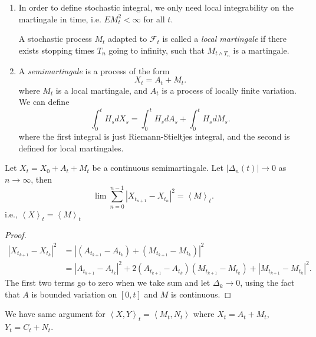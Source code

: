 \begin{remark}
	\begin{enumerate}
		\item In order to define stochastic integral, we only need local integrability on the martingale in time, i.e. $E M_t^2 < \infty $ for all $t$.

\begin{definition}
	A stochastic process $M_t$ adapted to $\mathcal{F}_t$ is called a \textit{local martingale} if there exists stopping times $T_n$ going to infinity, such that $M_{t \wedge T_n}$ is a martingale.
\end{definition}

\item A \textit{semimartingale} is a process of the form
	\[
		X_t = A_t + M_t
	.\] 
	where $M_t$ is a local martingale, and $A_t$ is a process of locally finite variation. We can define
	\[
		\int _0^t H_s d X_s = \int _0^t H_s d A_s + \int _0^t H_s d M_s
	.\] 
	where the first integral is just Riemann-Stieltjes integral, and the second is defined for local martingales.
	\end{enumerate}
\end{remark}

\begin{lemma}
	Let $X_t = X_0 + A_t + M_t$ be a continuous semimartingale. Let $\left| \Delta_n(t) \right|  \to  0$ as $n \to \infty $, then
	\[
		\lim \sum_{n=0}^{n-1} \left| X_{t_{n+1}} - X_{t_n} \right| ^2 = \left\langle M \right\rangle _t
	.\] 
	i.e., $\left\langle X \right\rangle _t = \left\langle M \right\rangle _t$
\end{lemma}
\begin{proof}
	\begin{align*}
		\left| X_{t_{k+1}} - X_{t_k} \right| ^2
		&= \left| (A_{t_{k+1}} - A_{t_k})+(M_{t_{k+1}} - M_{t_k}) \right|^2  \\
		&= \left| A_{t_{k+1}} - A_{t_k}\right|^2
		+ 2(A_{t_{k+1}} - A_{t_k}) (M_{t_{k+1}} - M_{t_k})
		+ \left| M_{t_{k+1}} - M_{t_k}\right|^2  
	.\end{align*}
	The first two terms go to zero when we take sum and let $\Delta_k \to 0 $, using the fact that $A$ is bounded variation on $[0,t]$ and $M$ is continuous.
\end{proof}
\begin{remark}
	We have same argument for $\left\langle X, Y \right\rangle _t = \left\langle M_t, N_t \right\rangle $ where $X_t = A_t + M_t$, $Y_t = C_t + N_t$.
\end{remark}

